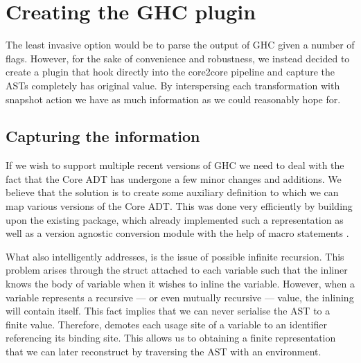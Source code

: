 %     
% 
%     
%   
%   
% 

\section{Creating the GHC plugin}

The least invasive option would be to parse the output of GHC given a number of  flags. However, for the sake
of convenience and robustness, we instead decided to create a plugin that hook directly into the core2core pipeline and
capture the ASTs completely has original value. By interspersing each transformation with snapshot action we have as much information
as we could reasonably hope for.

\subsection{Capturing the information}
\label{section:methods:capturing_info}

If we wish to support multiple recent versions of GHC we need to deal with the fact that the Core ADT has undergone
a few minor changes and additions. We believe that the solution is to create some auxiliary definition to which we can
map various versions of the Core ADT. This was done very efficiently by building upon the existing  package,
which already implemented such a representation as well as a version agnostic conversion module with the help of 
macro statements \cite{ghc_dump}. 

What  also intelligently addresses, is the issue of possible infinite recursion.
This problem arises through the  struct attached to each variable such that the inliner
knows the body of variable when it wishes to inline the variable. However, when a variable represents a recursive ---
or even mutually recursive --- value, the inlining will contain itself. This fact implies that we can never serialise 
the AST to a finite value. Therefore,  demotes each usage site of a variable to an identifier referencing its binding site.
This allows us to obtaining a finite representation that we can later reconstruct by traversing
the AST with an environment.

